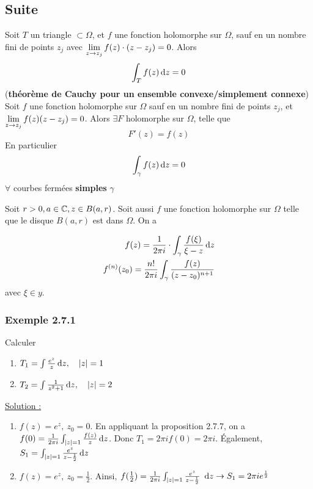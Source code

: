 \documentclass[12pt,a4paper]{article}
\begin{document}
\subsection*{Suite}
 Soit $T$ un triangle $\subset \Omega$, et $f$ une fonction holomorphe sur $\Omega$, sauf en un nombre fini de points $z_j$ avec $ \lim\limits_{z\to z_j} f(z) \cdot (z-z_j) = 0$. Alors 
\begin{equation}
    \int_T f(z) \, \mathrm d z = 0
\end{equation}
(\textbf{théorème de Cauchy pour un ensemble convexe/simplement connexe}) Soit $f$ une fonction holomorphe sur $\Omega$ sauf en un nombre fini de points $z_j$, et $\lim\limits_{z\to z_j} f(z)(z-z_j) = 0$. Alors $\exists F$ holomorphe sur $\Omega$, telle que 
\begin{equation}
    F'(z) = f(z)
\end{equation}
En particulier 
\[\int_\gamma f(z) \, \mathrm d z = 0\]
$\forall$ courbes fermées \textbf{simples} $\gamma$

 Soit $r > 0, a \in \mathbb{C}, z \in B(a,r)$. Soit aussi $f$ une fonction holomorphe sur $\Omega$ telle que le disque $B(a,r)$ est dans $\Omega$. On a 

\begin{align}
    f(z) = \frac{1}{2\pi i} \cdot \int_\gamma \frac{f(\xi)}{\xi-z}\, \mathrm d z\\
    f^{(n)}(z_0) = \frac{n!}{2\pi i}\int_\gamma \frac{f(z)}{(z-z_0)^{n+1}}
\end{align}
avec $\xi \in y$.

\subsubsection*{Exemple 2.7.1}
Calculer
\begin{enumerate}
    \item $T_1 = \int \frac{e^z}{z}\, \mathrm d z,\quad |z| = 1$
    \item $T_2 = \int \frac{1}{z^2+1} \, \mathrm d z,\quad |z| = 2$
\end{enumerate}
\uline{Solution :}
\begin{enumerate}
    \item $f(z) = e^z,\ z_0 = 0$. En appliquant la proposition 2.7.7, on a $f(0) = \frac{1}{2\pi i}\int_{|z| = 1} \frac{f(z)}{z} \, \mathrm d z$. Donc $T_1 = 2\pi i f(0) = 2\pi i$. Également, $S_1 = \int_{|z|=1} \frac{e^z}{z-\frac{1}{2}} \, \mathrm d z$
    \item $f(z) = e^z,\ z_0 = \frac{1}{2}$. Ainsi, $f(\frac{1}{2}) = \frac{1}{2\pi i} \int_{|z| = 1} \frac{e^z}{z-\frac{1}{2}}\ \, \mathrm d z \to S_1 = 2\pi i e^\frac{1}{2}$
\end{enumerate}
\end{document}
